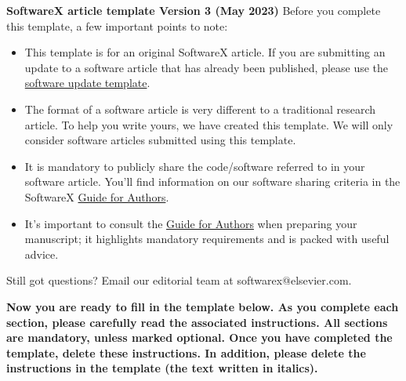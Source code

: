 \documentclass[preprint,12pt, a4paper]{elsarticle}
\begin{document}
\renewcommand{\labelenumii}{\arabic{enumi}.\arabic{enumii}}

\begin{frontmatter}

  {\large\textbf{SoftwareX article template Version 3 (May 2023)}}
  Before you complete this template, a few important points to note:
  \begin{itemize}
\item	This template is for an original SoftwareX article. If you are submitting an update to a software article that has already been published, please use the \href{https://www.elsevier.com/__data/assets/word_doc/0008/76958/Software-Update-Template-v1.3.dotx}{software update template}.
\item	The format of a software article is very different to a traditional research article. To help you write yours, we have created this template. We will only consider software articles submitted using this template.
\item	It is mandatory to publicly share the code/software referred to in your software article. You’ll find information on our software sharing criteria in the SoftwareX \href{https://www.elsevier.com/journals/softwarex/2352-7110/guide-for-authors}{Guide for Authors}.  
\item	It’s important to consult the \href{https://www.elsevier.com/journals/softwarex/2352-7110/guide-for-authors}{Guide for Authors} when preparing your manuscript; it highlights mandatory requirements and is packed with useful advice.
\end{itemize}
%
Still got questions?
Email our editorial team at softwarex@elsevier.com.

\textbf{Now you are ready to fill in the template below. As you complete each section, please carefully read the associated instructions. All sections are mandatory, unless marked optional.
Once you have completed the template, delete these instructions. In addition, please delete the instructions in the template (the text written in italics).}
 



\end{frontmatter}
\end{document}
